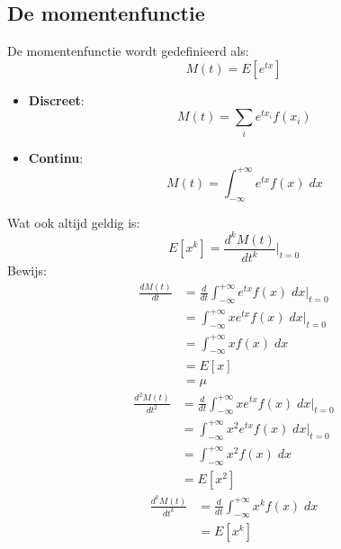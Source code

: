 \documentclass[12pt]{report}
\begin{document}
\subsection{De momentenfunctie}
De momentenfunctie wordt gedefinieerd als:
$$M(t) = E[e^{tx}]$$
\begin{itemize}
 \item \textbf{Discreet}: $$M(t) = \sum_{i} e^{tx_i} f(x_i)$$
 \item \textbf{Continu}: $$M(t) = \int_{-\infty}^{+\infty} e^{tx} f(x)\; dx$$
\end{itemize}
Wat ook altijd geldig is:
$$E[x^k] = \frac{d^kM(t)}{dt^k}\bigg|_{t=0}$$
Bewijs:
\begin{equation*}
 \begin{split}
  \frac{dM(t)}{dt}             & = \frac{d}{dt}\int_{-\infty}^{+\infty} e^{tx} f(x)\; dx \bigg|_{t=0} \\
                               & = \int_{-\infty}^{+\infty} xe^{tx} f(x)\; dx \bigg|_{t=0} \\
                               & = \int_{-\infty}^{+\infty} x f(x)\; dx \\
                               & = E[x] \\
                               & = \mu
 \end{split}
\end{equation*}
\begin{equation*}
 \begin{split}
  \frac{d^2M(t)}{dt^2}         & = \frac{d}{dt}\int_{-\infty}^{+\infty} xe^{tx} f(x)\; dx \bigg|_{t=0} \\
                               & = \int_{-\infty}^{+\infty} x^2e^{tx} f(x)\; dx \bigg|_{t=0} \\
                               & = \int_{-\infty}^{+\infty} x^2 f(x)\; dx \\
                               & = E[x^2]
 \end{split}
\end{equation*}
\begin{equation*}
 \begin{split}
  \frac{d^kM(t)}{dt^k}             & = \frac{d}{dt}\int_{-\infty}^{+\infty} x^k f(x)\; dx \\
                                   & = E[x^k]
 \end{split}
\end{equation*}
\end{document}
